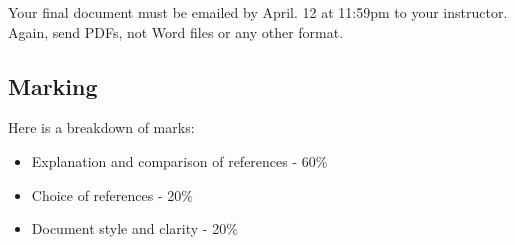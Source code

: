 \documentclass[letterpaper]{article}
\begin{document}
Your final document must be emailed by April. 12 at 11:59pm to your instructor.  Again, send PDFs, not Word files or any
other format.

\subsection*{Marking}

Here is a breakdown of marks:

\begin{itemize}
\item Explanation and comparison of references - 60\%
\item Choice of references - 20\%
\item Document style and clarity - 20\%
\end{itemize}


\end{document}
